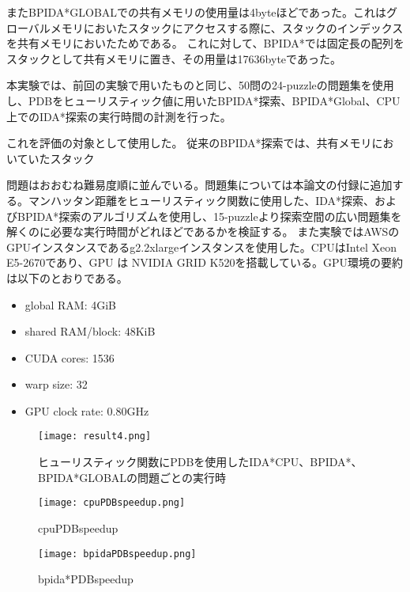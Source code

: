 \documentclass[a4paper,11pt,oneside,openany]{jsbook}
\begin{document}
またBPIDA*GLOBALでの共有メモリの使用量は4byteほどであった。これはグローバルメモリにおいたスタックにアクセスする際に、スタックのインデックスを共有メモリにおいたためである。
これに対して、BPIDA*では固定長の配列をスタックとして共有メモリに置き、その用量は17636byteであった。



本実験では、前回の実験で用いたものと同じ、50問の24-puzzleの問題集を使用し、PDBをヒューリスティック値に用いたBPIDA*探索、BPIDA*Global、CPU上でのIDA*探索の実行時間の計測を行った。

これを評価の対象として使用した。
従来のBPIDA*探索では、共有メモリにおいていたスタック

問題はおおむね難易度順に並んでいる。問題集については本論文の付録に追加する。マンハッタン距離をヒューリスティック関数に使用した、IDA*探索、およびBPIDA*探索\cite{HA17}のアルゴリズムを使用し、15-puzzleより探索空間の広い問題集を解くのに必要な実行時間がどれほどであるかを検証する。
また実験ではAWSのGPUインスタンスであるg2.2xlargeインスタンスを使用した。CPUはIntel Xeon E5-2670であり、GPU
は NVIDIA GRID K520を搭載している。GPU環境の要約は以下のとおりである。
\begin{itemize}
 \item global RAM: 4GiB
 \item shared RAM/block: 48KiB
 \item CUDA cores: 1536
 \item warp size: 32
 \item GPU clock rate: 0.80GHz
\end{itemize}


\begin{figure}[hbtp]
\begin{center}
\texttt{[image: result4.png]}
\caption{ヒューリスティック関数にPDBを使用したIDA*CPU、BPIDA*、BPIDA*GLOBALの問題ごとの実行時}
\end{center}
\end{figure}

\begin{figure}[hbtp]
\begin{center}
\texttt{[image: cpuPDBspeedup.png]}
\caption{cpuPDBspeedup}
\end{center}
\end{figure}

\begin{figure}[hbtp]
\begin{center}
\texttt{[image: bpidaPDBspeedup.png]}
\caption{bpida*PDBspeedup}
\end{center}
\end{figure}
\end{document}
